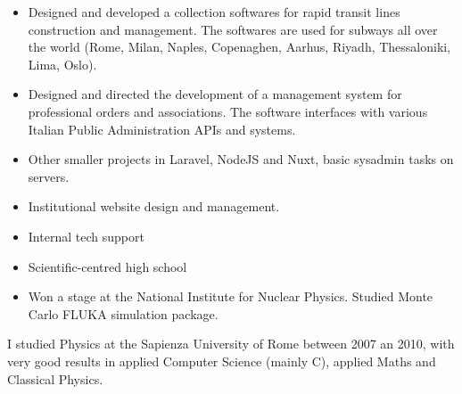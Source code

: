 \documentclass[10pt,a4paper]{altacv}
\begin{document}

\begin{fullwidth}
\makecvheader
\end{fullwidth}


\begin{itemize}
\item Designed and developed a collection softwares for rapid transit lines construction and management. The softwares are used for subways all over the world (Rome, Milan, Naples, Copenaghen, Aarhus, Riyadh, Thessaloniki, Lima, Oslo).
\item Designed and directed the development of a management system for professional orders and associations. The software interfaces with various Italian Public Administration APIs and systems.
\item Other smaller projects in Laravel, NodeJS and Nuxt, basic sysadmin tasks on servers.
\end{itemize}

\divider

\begin{itemize}
\item Institutional website design and management.
\item Internal tech support
\end{itemize}


\begin{itemize}
\item Scientific-centred high school
\item Won a stage at the National Institute for Nuclear Physics. Studied Monte Carlo FLUKA simulation package.
\end{itemize}

I studied Physics at the Sapienza University of Rome between 2007 an 2010, with very good results in applied Computer Science (mainly C), applied Maths and Classical Physics.
\end{document}
